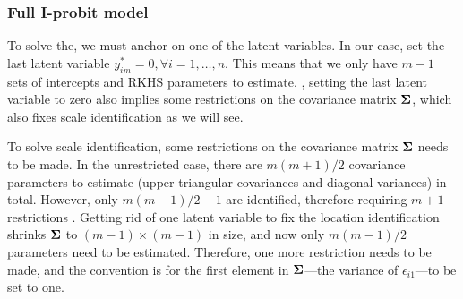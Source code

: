 \subsubsection{Full I-probit model}

To solve the, we must anchor on one of the latent variables.
In our case, set the last latent variable $y_{im}^* = 0, \forall i = 1,\dots,n$. 
This means that we only have $m-1$ sets of intercepts and RKHS parameters to estimate.
, setting the last latent variable to zero also implies some restrictions on the covariance matrix ${\bm\Sigma}$, which also fixes scale identification as we will see.


To solve scale identification, some restrictions on the covariance matrix ${\bm\Sigma}$ needs to be made.
In the unrestricted case, there are $m(m+1)/2$ covariance parameters to estimate (upper triangular covariances and diagonal variances) in total. 
However, only $m(m-1)/2 - 1$ are identified, therefore requiring $m + 1$ restrictions \citep{Keane1992,train2009discrete}. 
Getting rid of one latent variable to fix the location identification shrinks ${\bm\Sigma}$ to $(m-1) \times (m-1)$ in size, and now only $m(m-1)/2$ parameters need to be estimated. 
Therefore, one more restriction needs to be made, and the convention is for the first element in ${\bm\Sigma}$---the variance of $\epsilon_{i1}$---to be set to one. 





